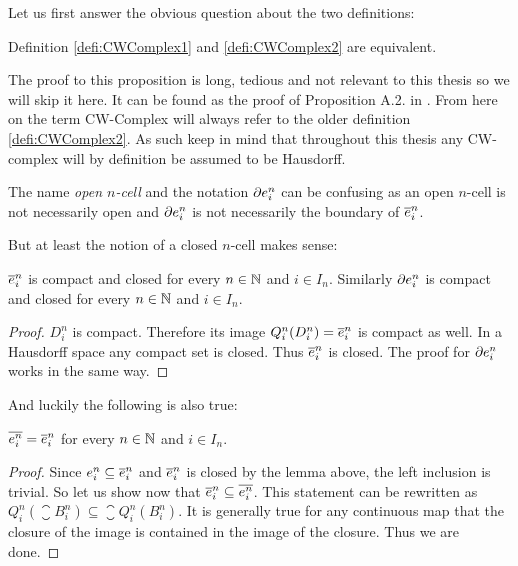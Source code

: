 Let us first answer the obvious question about the two definitions:

\begin{prop}
    Definition \ref{defi:CWComplex1} and \ref{defi:CWComplex2} are equivalent.
\end{prop}

The proof to this proposition is long, tedious and not relevant to this thesis so we will skip it here. 
It can be found as the proof of Proposition A.2. in \cite{Hatcher2001}.
From here on the term CW-Complex will always refer to the older definition \ref{defi:CWComplex2}.
As such keep in mind that throughout this thesis any CW-complex will by definition be assumed to be Hausdorff.

\begin{rem}
    The name \emph{open $n$-cell} and the notation $\ecell{n}{i}$ can be confusing as an open $n$-cell is not necessarily open and $\ecell{n}{i}$  is not necessarily the boundary of $\ccell{n}{i}$.
\end{rem}

But at least the notion of a closed $n$-cell makes sense: 

\begin{lem}\label{lem:ccellclosed}
    $\ccell{n}{i}$ is compact and closed for every $n \in \bN$ and $i \in I_n$. 
    Similarly $\ecell{n}{i}$ is compact and closed for every $n \in \bN$ and $i \in I_n$. 
\end{lem}
\begin{proof}
    $D_i^n$ is compact. 
    Therefore its image $Q_i^n(D_i^n) = \ccell{n}{i}$ is compact as well. 
    In a Hausdorff space any compact set is closed. 
    Thus $\ccell{n}{i}$ is closed. 
    The proof for $\ecell{n}{i}$ works in the same way.
\end{proof}

And luckily the following is also true: 

\begin{lem}
    $\closure{\ocell{n}{i}} = \ccell{n}{i}$ for every $n \in \bN$ and $i \in I_n$. 
\end{lem}
\begin{proof}
    Since $\ocell{n}{i} \subseteq \ccell{n}{i}$ and $\ccell{n}{i}$ is closed by the lemma above, the left inclusion is trivial. 
    So let us show now that $\ccell{n}{i} \subseteq \closure{\ocell{n}{i}}$. 
    This statement can be rewritten as $Q_i^n \left ( \closure{B_i^n} \right ) \subseteq \closure{Q_i^n(B_i^n)}$.
    It is generally true for any continuous map that the closure of the image is contained in the image of the closure. 
    Thus we are done.
\end{proof}

